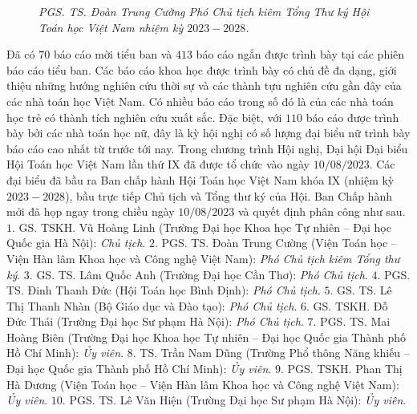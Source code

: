 \begin{multicols}{2}
\begin{figure}[H]
		\caption{\small\textit{\color{doisongtoanhoc}PGS. TS. Đoàn Trung Cường Phó Chủ tịch kiêm Tổng Thư ký Hội Toán học Việt Nam nhiệm kỳ $2023-2028$.}}
		\vspace*{-10pt}
	\end{figure}
	Đã có $70$ báo cáo mời tiểu ban và $413$ báo cáo ngắn được trình bày tại các phiên báo cáo tiểu ban. Các báo cáo khoa học được trình bày có chủ đề đa dạng, giới thiệu những hướng nghiên cứu thời sự và các thành tựu nghiên cứu gần đây của các nhà toán học Việt Nam. Có nhiều báo cáo trong số đó là của các nhà toán học trẻ có thành tích nghiên cứu xuất sắc. Đặc biệt, với $110$ báo cáo được trình bày bởi các nhà toán học nữ, đây là kỳ hội nghị có số lượng đại biểu nữ trình bày báo cáo cao nhất từ trước tới nay.
	\vskip 0.1cm
	Trong chương trình Hội nghị, Đại hội Đại biểu Hội Toán học Việt Nam lần thứ IX đã được tổ chức vào ngày $10/08/2023$. Các đại biểu đã bầu ra Ban chấp hành Hội Toán học Việt Nam khóa IX (nhiệm kỳ $2023-2028$), bầu trực tiếp Chủ tịch và Tổng thư ký của Hội. Ban Chấp hành mới đã họp ngay trong chiều ngày $10/08/2023$ và quyết định phân công như sau.
	\vskip 0.1cm
	$1.$ GS. TSKH. Vũ Hoàng Linh (Trường Đại học Khoa học Tự nhiên -- Đại học Quốc gia Hà Nội): \textit{Chủ tịch}.
	\vskip 0.1cm
	$2.$ PGS. TS. Đoàn Trung Cường (Viện Toán học – Viện Hàn lâm Khoa học và Công nghệ Việt Nam): \textit{Phó Chủ tịch kiêm Tổng thư ký}.
	\vskip 0.1cm
	$3.$	GS. TS. Lâm Quốc Anh (Trường Đại học Cần Thơ): \textit{Phó Chủ tịch}.
	\vskip 0.1cm
	$4.$	PGS. TS. Đinh Thanh Đức (Hội Toán học Bình Định): \textit{Phó Chủ tịch}.
	\vskip 0.1cm
	$5.$	GS. TS. Lê Thị Thanh Nhàn (Bộ Giáo dục và Đào tạo): \textit{Phó Chủ tịch}.
	\vskip 0.1cm
	$6.$	GS. TSKH. Đỗ Đức Thái (Trường Đại học Sư phạm Hà Nội): \textit{Phó Chủ tịch}.
	\vskip 0.1cm
	$7.$	PGS. TS. Mai Hoàng Biên (Trường Đại học Khoa học Tự nhiên -- Đại học Quốc gia Thành phố Hồ Chí Minh): \textit{Ủy viên}.
	\vskip 0.1cm
	$8.$	TS. Trần Nam Dũng (Trường Phổ thông Năng khiếu -- Đại học Quốc gia Thành phố Hồ Chí Minh): \textit{Ủy viên}.
	$9.$	PGS. TSKH. Phan Thị Hà Dương (Viện Toán học -- Viện Hàn lâm Khoa học và Công nghệ Việt Nam): \textit{Ủy viên}.
	\vskip 0.1cm
	$10.$	PGS. TS. Lê Văn Hiện (Trường Đại học Sư phạm Hà Nội): \textit{Ủy viên}.
	\end{multicols}
